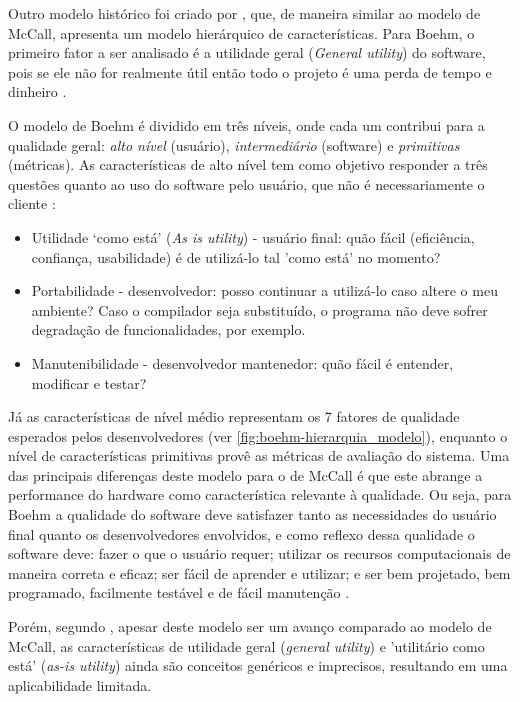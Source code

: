 \documentclass[
	12pt,				%
	openright,			%
	oneside,			%
	a4paper,			%
	english,			%
	brazil,				%
	]{abntex2}
\begin{document}
Outro modelo histórico foi criado por , que, de maneira similar ao modelo de McCall, apresenta um modelo hierárquico de características. Para Boehm, o primeiro fator a ser analisado é a utilidade geral (\emph{General utility}) do software, pois se ele não for realmente útil então todo o projeto é uma perda de tempo e dinheiro \cite{PFLEEGER2010}.

O modelo de Boehm é dividido em três níveis, onde cada um contribui para a qualidade geral: \emph{alto nível} (usuário), \emph{intermediário} (software) e \emph{primitivas} (métricas). As características de alto nível tem como objetivo responder a três questões quanto ao uso do software pelo usuário, que não é necessariamente o cliente \cite{berander2005}:

\begin{itemize}
    \item Utilidade `como está' (\emph{As is utility}) - usuário final: quão fácil (eficiência, confiança, usabilidade) é de utilizá-lo tal 'como está' no momento?
    \item Portabilidade - desenvolvedor: posso continuar a utilizá-lo caso altere o meu ambiente? Caso o compilador seja substituído, o programa não deve sofrer degradação de funcionalidades, por exemplo.
    \item Manutenibilidade - desenvolvedor mantenedor: quão fácil é entender, modificar e testar?
\end{itemize}

Já as características de nível médio representam os 7 fatores de qualidade esperados pelos desenvolvedores (ver \autoref{fig:boehm-hierarquia_modelo}), enquanto o nível de características primitivas provê as métricas de avaliação do sistema. Uma das principais diferenças deste modelo para o de McCall é que este abrange a performance do hardware como característica relevante à qualidade. Ou seja, para Boehm a qualidade do software deve satisfazer tanto as necessidades do usuário final quanto os desenvolvedores envolvidos, e como reflexo dessa qualidade o software deve: fazer o que o usuário requer; utilizar os recursos computacionais de maneira correta e eficaz; ser fácil de aprender e utilizar; e ser bem projetado, bem programado, facilmente testável e de fácil manutenção \cite{PFLEEGER2010}.

Porém, segundo , apesar deste modelo ser um avanço comparado ao modelo de McCall, as características de utilidade geral (\emph{general utility}) e 'utilitário como está' (\emph{as-is utility}) ainda são conceitos genéricos e imprecisos, resultando em uma aplicabilidade limitada.
\end{document}
